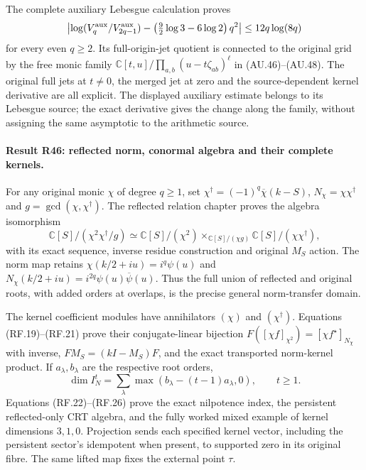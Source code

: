 The complete auxiliary Lebesgue calculation proves
\[
 \left|\log(V_q^{\rm aux}/V_{2q-1}^{\rm aux})
       -\left(\tfrac92\log3-6\log2\right)q^2\right|
 \le12q\log(8q)
\]
for every even $q\ge2$. Its full-origin-jet quotient is connected
to the original grid by the free monic family
$\mathbb C[t,u]/\prod_{a,b}(u-t\zeta_{ab})^\ell$ in
(AU.46)--(AU.48). The original full jets at $t\ne0$, the merged
jet at zero and the source-dependent kernel derivative are all
explicit. The displayed auxiliary estimate belongs to its
Lebesgue source; the exact derivative gives the change along the
family, without assigning the same asymptotic to the arithmetic source.

\paragraph{Result R46: reflected norm, conormal algebra and their complete kernels.}
For any original monic $\chi$ of degree $q\ge1$, set
$\chi^\dagger=(-1)^q\overline\chi(k-S)$,
$N_\chi=\chi\chi^\dagger$ and $g=\gcd(\chi,\chi^\dagger)$.
The reflected relation chapter proves the algebra isomorphism
\[
 \mathbb C[S]/(\chi^2\chi^\dagger/g)
 \simeq
 \mathbb C[S]/(\chi^2)
 \mathbin{\times}_{\mathbb C[S]/(\chi g)}
 \mathbb C[S]/(\chi\chi^\dagger),
\]
with its exact sequence, inverse residue construction and original
$M_S$ action. The norm map retains
$\chi(k/2+iu)=i^q\psi(u)$ and
$N_\chi(k/2+iu)=i^{2q}\psi(u)\overline\psi(u)$.
Thus the full union of reflected and original roots, with added
orders at overlaps, is the precise general norm-transfer domain.

The kernel coefficient modules have annihilators $(\chi)$ and
$(\chi^\dagger)$. Equations (RF.19)--(RF.21) prove their
conjugate-linear bijection
$F([\chi f]_{\chi^2})=[\chi f^\star]_{N_\chi}$ with inverse,
$FM_S=(kI-M_S)F$, and the exact transported norm-kernel product.
If $a_\lambda,b_\lambda$ are the respective root orders,
\[
 \dim I_N^t=\sum_\lambda
            \max(b_\lambda-(t-1)a_\lambda,0),\qquad t\ge1.
\]
Equations (RF.22)--(RF.26) prove the exact nilpotence index, the
persistent reflected-only CRT algebra, and the fully worked mixed
example of kernel dimensions $3,1,0$. Projection sends each
specified kernel vector, including the persistent sector's
idempotent when present, to supported zero in its original fibre.
The same lifted map fixes the external point $\tau$.



